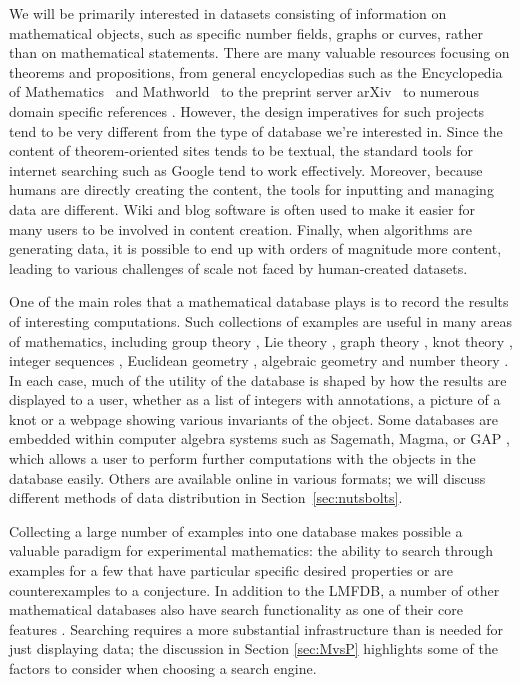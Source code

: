\documentclass{amsart}
\begin{document}
We will be primarily interested in datasets consisting of information on mathematical objects, such as specific number fields, graphs or curves, rather than on mathematical statements.
There are many valuable resources focusing on theorems and propositions, from general encyclopedias such as the Encyclopedia of Mathematics~\cite{encofmath} and Mathworld~\cite{mathworld} to the preprint server arXiv~\cite{arxiv} to numerous domain specific references .
However, the design imperatives for such projects tend to be very different from the type of database we're interested in.
Since the content of theorem-oriented sites tends to be textual, the standard tools for internet searching such as Google tend to work effectively.
Moreover, because humans are directly creating the content, the tools for inputting and managing data are different.
Wiki  and blog \cite{fanosearch} software is often used to make it easier for many users to be involved in content creation.
Finally, when algorithms are generating data, it is possible to end up with orders of magnitude more content, leading to various challenges of scale not faced by human-created datasets.

One of the main roles that a mathematical database plays is to record the results of interesting computations.
Such collections of examples are useful in many areas of mathematics, including group theory , Lie theory , graph theory \cite{hog}, knot theory \cite{knotinfo}, integer sequences \cite{oeis}, Euclidean geometry \cite{etc}, algebraic geometry \cite{fanosearch} and number theory .
In each case, much of the utility of the database is shaped by how the results are displayed to a user, whether as a list of integers with annotations, a picture of a knot or a webpage showing various invariants of the object.
Some databases are embedded within computer algebra systems such as Sagemath, Magma, or GAP ,
which allows a user to perform further computations with the objects in the database easily.
Others are available online in various formats; we will discuss different methods of data distribution in Section~\ref{sec:nutsbolts}.

Collecting a large number of examples into one database makes possible a valuable paradigm for experimental mathematics: the ability to search through examples for a few that have particular specific desired properties or are counterexamples to a conjecture.
In addition to the LMFDB, a number of other mathematical databases also have search functionality as one of their core features .
Searching requires a more substantial infrastructure than is needed for just displaying data; the discussion in Section \ref{sec:MvsP} highlights some of the factors to consider when choosing a search engine.
\end{document}
